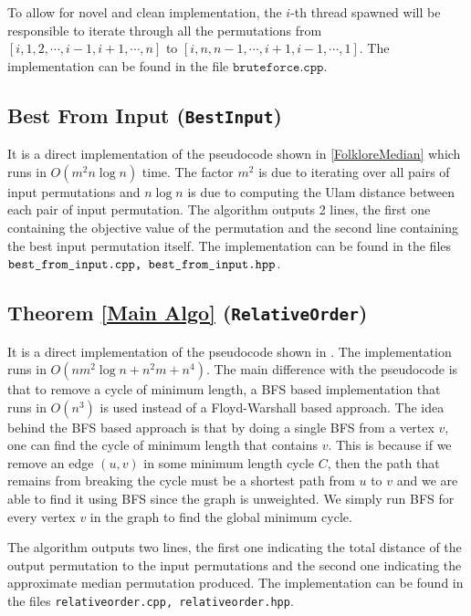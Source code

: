 To allow for novel and clean implementation, the $i$-th thread spawned will be responsible to iterate through all the permutations from $[i, 1, 2, \cdots, i - 1, i + 1, \cdots, n]$ to $[i, n, n - 1, \cdots, i + 1, i - 1, \cdots, 1]$. The implementation can be found in the file $\texttt{bruteforce.cpp}$.

\subsection{Best From Input (\texttt{BestInput})}
It is a direct implementation of the pseudocode shown in \ref{FolkloreMedian} which runs in $O(m^2 n \log n)$ time. The factor $m^2$ is due to iterating over all pairs of input permutations and $n \log n$ is due to computing the Ulam distance between each pair of input permutation. The algorithm outputs 2 lines, the first one containing the objective value of the permutation and the second line containing the best input permutation itself. The implementation can be found in the files $\texttt{best\textunderscore from\textunderscore input.cpp, best\textunderscore from\textunderscore input.hpp}$.

\subsection{Theorem \ref{Main Algo} (\texttt{RelativeOrder})}
It is a direct implementation of the pseudocode shown in \cite{MainPaper}. The implementation runs in $O(nm^2 \log n + n^2m + n^4)$. The main difference with the pseudocode is that to remove a cycle of minimum length, a BFS based implementation that runs in $O(n^3)$ is used instead of a Floyd-Warshall based approach. The idea behind the BFS based approach is that by doing a single BFS from a vertex $v$, one can find the cycle of minimum length that contains $v$. This is because if we remove an edge $(u, v)$ in some minimum length cycle $C$, then the path that remains from breaking the cycle must be a shortest path from $u$ to $v$ and we are able to find it using BFS since the graph is unweighted. We simply run BFS for every vertex $v$ in the graph to find the global minimum cycle.

The algorithm outputs two lines, the first one indicating the total distance of the output permutation to the input permutations and the second one indicating the approximate median permutation produced. The implementation can be found in the files \texttt{relative\textunderscore order.cpp, relative\textunderscore order.hpp}.

